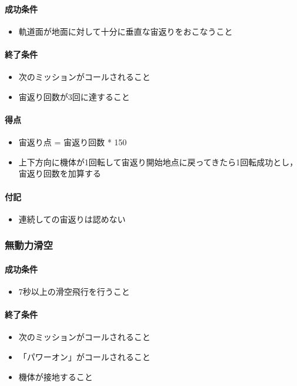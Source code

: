\paragraph{成功条件}
\begin{itemize}
\item 軌道面が地面に対して十分に垂直な宙返りをおこなうこと
\end{itemize}
\paragraph{終了条件}
\begin{itemize}
\item 次のミッションがコールされること
\item 宙返り回数が3回に達すること
\end{itemize}
\paragraph{得点}
\begin{itemize}
\item 宙返り点 = 宙返り回数 * 150
\item 上下方向に機体が1回転して宙返り開始地点に戻ってきたら1回転成功とし，宙返り回数を加算する
\end{itemize}
\paragraph{付記}
\begin{itemize}
\item 連続しての宙返りは認めない
\end{itemize}


\subsubsection{無動力滑空}
\paragraph{成功条件}
\begin{itemize}
\item 7秒以上の滑空飛行を行うこと
\end{itemize}
\paragraph{終了条件}
\begin{itemize}
\item 次のミッションがコールされること
\item 「パワーオン」がコールされること
\item 機体が接地すること
\end{itemize}

